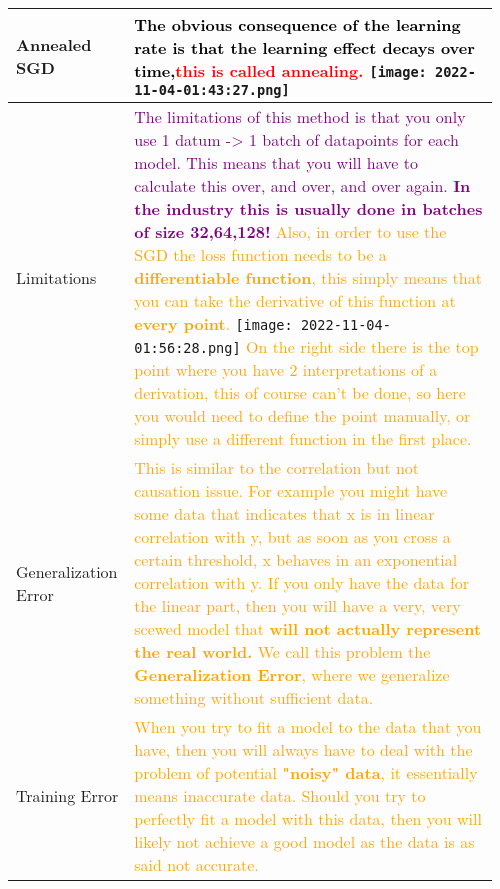 \documentclass[main.tex,fontsize=8pt,paper=a4,paper=portrait,DIV=calc,]{scrartcl}
\begin{document}
\begin{table}[ht!]
\begin{tabular}{|m{0.2\linewidth}|m{0.755\linewidth}|}
\hline
Annealed SGD & 
\textcolor{black}{The obvious consequence of the \textbf{learning rate} is that \textbf{the learning effect decays over time,}}\textcolor{red}{this is called \textbf{annealing}.}\newline
\texttt{[image: 2022-11-04-01:43:27.png]}\\
\hline
Limitations & 
\textcolor{purple}{The limitations of this method is that you only use 1 datum -> 1 batch of datapoints for each model. This means that you will have to calculate this over, and over, and over again.\newline
\textbf{In the industry this is usually done in batches of size 32,64,128!}}\newline
\textcolor{orange}{Also, in order to use the SGD the loss function needs to be a \textbf{differentiable function}, this simply means that you can take the derivative of this function at \textbf{every point}. }\newline
\texttt{[image: 2022-11-04-01:56:28.png]}\newline
\textcolor{orange}{On the right side there is the top point where you have 2 interpretations of a derivation, this of course can't be done, so here you would need to define the point manually, or simply use a different function in the first place.}\\
\hline
Generalization Error & 
\textcolor{orange}{This is similar to the correlation but not causation issue. \newline
For example you might have some data that indicates that x is in linear correlation with y, but as soon as you cross a certain threshold, x behaves in an exponential correlation with y.\newline
If you only have the data for the linear part, then you will have a very, very scewed model that \textbf{will not actually represent the real world.}\newline
We call this problem the \textbf{Generalization Error}, where we generalize something without sufficient data.}\\
\hline
Training Error & 
\textcolor{orange}{When you try to fit a model to the data that you have, then you will always have to deal with the problem of potential \textbf{"noisy" data}, it essentially means inaccurate data.\newline
Should you try to perfectly fit a model with this data, then you will likely not achieve a good model as the data is as said not accurate.}\newline

\end{tabular}
\end{table}
\end{document}

